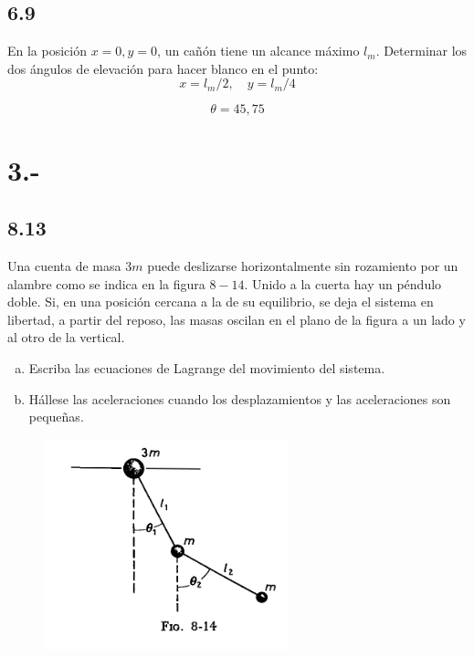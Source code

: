\documentclass{article}
\begin{document}
\subsection*{6.9}
En la posición $x=0, y=0$, un cañón tiene un alcance máximo $l_m$. Determinar los dos 
ángulos de elevación para hacer blanco en el punto:
\[ x = l_m/2, \quad y=l_m/4 \]
\begin{tcolorbox}[breakable]
    \[ \theta = 45, 75 \]
\end{tcolorbox}

\section*{3.-}
\subsection*{8.13}
Una cuenta de masa $3m$ puede deslizarse horizontalmente sin rozamiento por un alambre 
como se indica en la figura $8-14$. Unido a la cuerta hay un péndulo doble. Si, en una 
posición cercana a la de su equilibrio, se deja el sistema en libertad, a partir del
reposo, las masas oscilan en el plano de la figura a un lado y al otro de la vertical.
\begin{enumerate}[a)]
    \item Escriba las ecuaciones de Lagrange del movimiento del sistema.
    \item Hállese las aceleraciones cuando los desplazamientos y las aceleraciones son pequeñas.
\end{enumerate}
\begin{figure}[H]
    \centering
    \includegraphics[scale=0.8]{p3_pendulum.png}
\end{figure}
\end{document}
